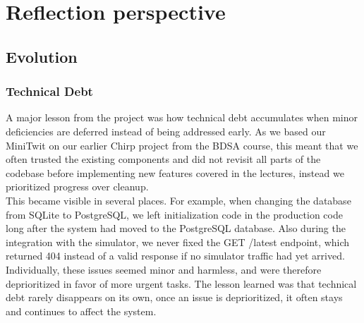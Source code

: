 \section{Reflection perspective}

\subsection{Evolution}

\subsubsection{Technical Debt}
A major lesson from the project was how technical debt accumulates when minor deficiencies are deferred instead of being addressed early. As we based our MiniTwit on our earlier Chirp project from the BDSA course, this meant that we often trusted the existing components and did not revisit all parts of the codebase before implementing new features covered in the lectures, instead we prioritized progress over cleanup. 
\\This became visible in several places. For example, when changing the database from SQLite to PostgreSQL, we left initialization code in the production code long after the system had moved to the PostgreSQL database. Also during the integration with the simulator, we never fixed the GET /latest endpoint, which returned 404 instead of a valid response if no simulator traffic had yet arrived. Individually, these issues seemed minor and harmless, and were therefore deprioritized in favor of more urgent tasks. The lesson learned was that technical debt rarely disappears on its own, once an issue is deprioritized, it often stays and continues to affect the system.

